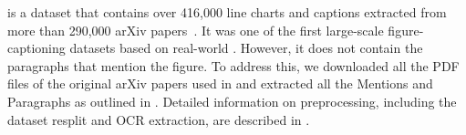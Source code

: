 %
%
\oldDataset is a dataset that contains over 416,000 line charts and captions extracted from more than 290,000 arXiv papers~\cite{hsu-etal-2021-scicap-generating}. 
It was one of the first large-scale figure-captioning datasets based on real-world \sfigs. 
However, it does not contain the paragraphs that mention the figure.
To address this, we downloaded all the PDF files of the original arXiv papers used in \oldDataset and
extracted all the Mentions and Paragraphs as outlined in .
Detailed information on preprocessing, including the dataset resplit and OCR extraction, are described in .

